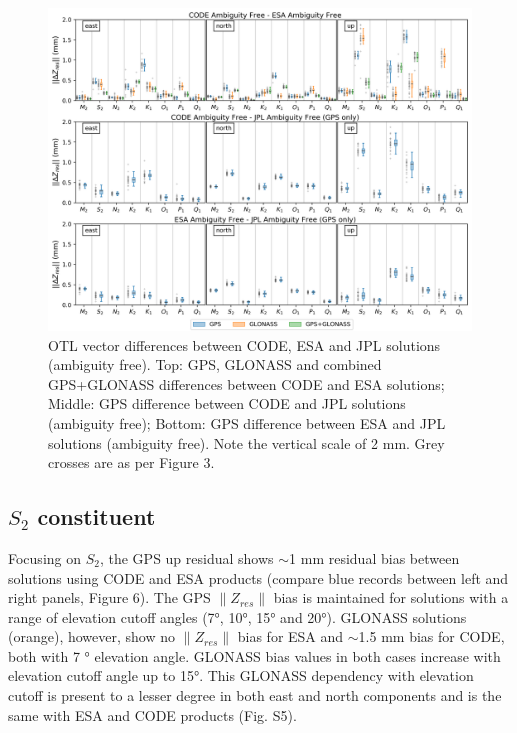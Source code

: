 \documentclass[se, manuscript]{copernicus}
\begin{document}
\begin{figure}[t]
\includegraphics[width=17cm]{fig05.png}
\caption{OTL vector differences between CODE, ESA and JPL solutions (ambiguity free). Top: GPS, GLONASS and combined GPS+GLONASS differences between CODE and ESA solutions; Middle: GPS difference between CODE and JPL solutions (ambiguity free); Bottom: GPS difference between ESA and JPL solutions (ambiguity free). Note the vertical scale of 2 mm. Grey crosses are as per Figure 3. }
\end{figure}

\subsection{$S_2$ constituent}
Focusing on $S_2$, the GPS up residual shows $\sim$1 mm residual bias between solutions using CODE and ESA products (compare blue records between left and right panels, Figure 6). The GPS $\|Z_{res}\|$ bias is maintained for solutions with a range of elevation cutoff angles (7°, 10°, 15° and 20°). GLONASS solutions (orange), however, show no $\|Z_{res}\|$ bias for ESA and $\sim$1.5 mm bias for CODE, both with 7 ° elevation angle. GLONASS bias values in both cases increase with elevation cutoff angle up to 15°. This GLONASS dependency with elevation cutoff is present to a lesser degree in both east and north components and is the same with ESA and CODE products (Fig. S5).
\end{document}
